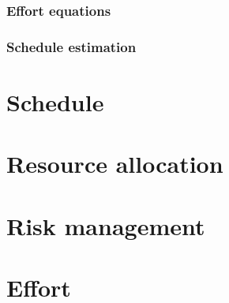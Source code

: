 \documentclass{article}
\begin{document}
	\subsubsection{Effort equations}
	\subsubsection{Schedule estimation}
\newpage

\section{Schedule}

\newpage

\section{Resource allocation}

\newpage

\section{Risk management}

\newpage

\section{Effort}
\end{document}
